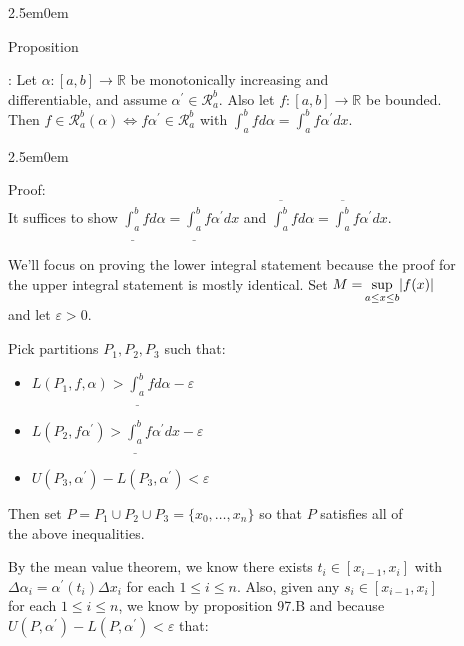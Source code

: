 \documentclass{book}
\newcommand{\hThree}{%
   \color{PineGreen!85!Orange}
   \fontsize{13}{15}\selectfont%
}
\newenvironment{myIndent}{%
   \begin{adjustwidth}{2.5em}{0em}%
}{%
   \end{adjustwidth}%
}
\newcounter{PropNumber}
\newcommand{\propCount}[1][1]{%
   \addtocounter{PropNumber}{#1}%
   \thePropNumber%
}
\newcommand{\retTwo}{\hfill\bigbreak}
\begin{document}
{\begin{myIndent}
   Proposition \propCount: Let $\alpha: [a, b] \longrightarrow \mathbb{R}$ be monotonically increasing and\\ differentiable, and assume $\alpha^\prime \in \mathscr{R}_a^b$. Also let $f: [a, b] \longrightarrow \mathbb{R}$ be bounded.\\ Then $f \in \mathscr{R}_a^b(\alpha) \Longleftrightarrow f\alpha^\prime \in \mathscr{R}_a^b$ with $\int_a^bfd\alpha = \int_a^bf\alpha^\prime dx$.\\ [-6pt]
   
   \begin{myIndent}\hThree
      Proof:\\
      It suffices to show $\underline{\int_a^b}fd\alpha = \underline{\int_a^b}f\alpha^\prime dx$ and $\overline{\int_a^b}fd\alpha = \overline{\int_a^b}f\alpha^\prime dx$.

      \newpage

      We'll focus on proving the lower integral statement because the proof for\\ the upper integral statement is mostly identical. Set $M = \hspace{-0.1em}\sup\limits_{a \leq x \leq b}\hspace{-0.2em}|f(x)|$\\ [-8.5pt] and let $\varepsilon > 0$.\retTwo

      Pick partitions $P_1, P_2, P_3$ such that:
      \begin{itemize}
         \item $L(P_1, f, \alpha) > \underline{\int_a^b}fd\alpha - \varepsilon$
         \item $L(P_2, f\alpha^\prime) > \underline{\int_a^b}f\alpha^\prime dx - \varepsilon$\\ [-10pt]
         \item $U(P_3, \alpha^\prime) - L(P_3, \alpha^\prime) < \varepsilon$\retTwo
      \end{itemize}

      Then set $P = P_1 \cup P_2 \cup P_3 = \{x_0, \ldots, x_n\}$ so that $P$ satisfies all of\\ the above inequalities.\retTwo
      
      By the mean value theorem, we know there exists $t_i \in [x_{i-1}, x_i]$ with\\ $\Delta \alpha_i = \alpha^\prime(t_i)\Delta x_i$ for each $1 \leq i \leq n$. Also, given any  $s_i \in [x_{i-1}, x_i]$\\ for each $1 \leq i \leq n$, we know by proposition 97.B and because\\ $U(P, \alpha^\prime) - L(P, \alpha^\prime) < \varepsilon$ that:


\end{myIndent}
\end{myIndent}}
\end{document}
